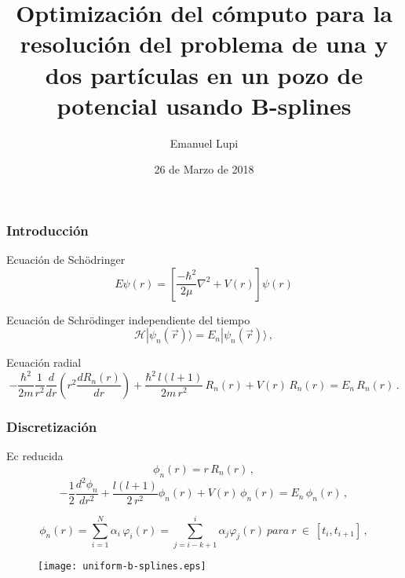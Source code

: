 \documentclass{beamer}
\title[]{Optimizaci\'on del c\'omputo para la resoluci\'on del problema de una y dos part\'iculas en un pozo de potencial usando B-splines}
\author[]{Emanuel Lupi}
\institute[]
{
  Universidad Nacional de C\'ordoba\\
  FaMAF
}
\date{26 de Marzo de 2018}
\begin{document}
\frame{\titlepage}




\begin{frame}
  \frametitle{Introducci\'on}
  \begin{block}{Ecuaci\'on de Sch\"odringer}
    \begin{displaymath}
        E\psi(r) = \left[\frac{-\hbar^2}{2\mu} \nabla^2 + V(r)\right]\psi(r)
    \end{displaymath}
  \end{block}

  \begin{block}{Ecuaci\'on de Schr\"odinger independiente del tiempo}
      \begin{displaymath}\label{ec_schrodinger}
        \mathcal{H} |\psi_n(\vec{r})\rangle = E_n |\psi_n(\vec{r})\rangle\,,
      \end{displaymath}
  \end{block}

  \begin{block}{Ecuaci\'on radial}
    \begin{displaymath}
        -\frac{\hbar^2}{2m} \frac{1}{r^2}\frac{d}{dr}\left(r^2\frac{dR_n(r)}{dr}\right) 
        + \frac{\hbar^2\,l(l+1)}{2m\,r^2}\,R_n(r) + V(r)\,R_n(r) = E_n\,R_n(r)\,.
    \end{displaymath}
  \end{block}
\end{frame}


\begin{frame}
  \frametitle{Discretizaci\'on}
   
  \begin{block}{Ec reducida}
  \begin{displaymath}
    \phi_n(r) = r\,R_n(r)\,,
  \end{displaymath} 
  \begin{displaymath}
    -\frac{1}{2} \frac{d^2 \phi_n}{dr^2} + \frac{l(l+1)}{2\,r^2} \phi_n(r) + V(r)\,\phi_n(r) = E_n\,\phi_n(r)\,,
  \end{displaymath} 
  \end{block}
  \begin{displaymath}\label{combinacion_lineal}
      \phi_n(r)=\sum_{i=1}^{N}\alpha_i\,\varphi_i(r) = \sum_{j=i-k+1}^{i}\alpha_j\varphi_j(r)\ para\ r\ \in\ [t_i, t_{i+1}]\,,
  \end{displaymath}

  \begin{figure}[!tbp]
    \centering
    \texttt{[image: uniform-b-splines.eps]}
  \end{figure}
\end{frame}
\end{document}
